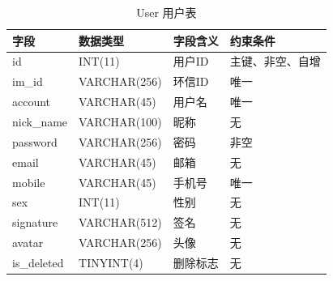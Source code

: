 		\begin{table}[H]
		\centering
		\caption{User 用户表}
		\label{tab:db_table_user}
		\begin{tabular}{p{}p{}p{}p{}}
		\hline
		字段          & 数据类型         & 字段含义   & 约束条件     \\ \hline
		id          & INT(11)      & 用户ID & 主键、非空、自增 \\
		im\_id      & VARCHAR(256) & 环信ID & 唯一       \\ 
		account     & VARCHAR(45)  & 用户名  & 唯一       \\ 
		nick\_name  & VARCHAR(100) & 昵称   & 无        \\
		password    & VARCHAR(256) & 密码   & 非空       \\ 
		email       & VARCHAR(45)  & 邮箱   & 无        \\
		mobile      & VARCHAR(45)  & 手机号  & 唯一        \\ 
		sex         & INT(11)      & 性别   & 无        \\ 
		signature   & VARCHAR(512) & 签名   & 无        \\
		avatar      & VARCHAR(256) & 头像   & 无        \\
		is\_deleted & TINYINT(4)   & 删除标志 & 无        \\ \hline
		\end{tabular}
		\end{table}
		
 \clearpage